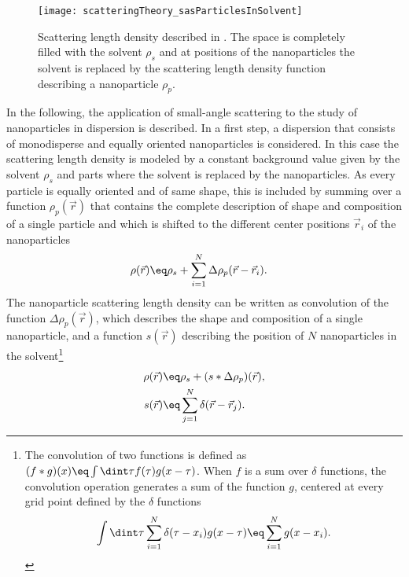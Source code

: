 \documentclass[\main/dresen_thesis.tex]{subfiles}
\begin{document}
    \begin{figure}[tb]
      \centering
      \texttt{[image: scatteringTheory\_sasParticlesInSolvent]}
      \caption{\label{fig:theoreticalBackground:scattering:scatteringTheory:sasParticlesInSolvent}Scattering length density described in . The space is completely filled with the solvent $\rho_s$ and at positions of the nanoparticles the solvent is replaced by the scattering length density function describing a nanoparticle $\rho_p$.}
    \end{figure}
    In the following, the application of small-angle scattering to the study of nanoparticles in dispersion is described.
    In a first step, a dispersion that consists of monodisperse and equally oriented nanoparticles is considered.
    In this case the scattering length density is modeled by a constant background value given by the solvent $\rho_s$ and parts where the solvent is replaced by the nanoparticles.
    As every particle is equally oriented and of same shape, this is included by summing over a function $\rho_p (\vec{r})$ that contains the complete description of shape and composition of a single particle and which is shifted to the different center positions $\vec{r}_i$ of the nanoparticles
    \begin{align}
      \rho(\vec{r}) \eq& \rho_s + \sum_{i=1}^N \Delta \rho_{p}(\vec{r} - \vec{r}_i).\label{eq:theoreticalBackground:scattering:scatteringTheory:sasParticlesInSolvent}
    \end{align}
    The nanoparticle scattering length density can be written as convolution of the function $\Delta \rho_{p}(\vec{r})$, which describes the shape and composition of a single nanoparticle, and a function $s(\vec{r})$ describing the position of $N$ nanoparticles in the solvent\footnote{The convolution of two functions is defined as $(f*g)(x) \eq \int \dint \tau f(\tau) g(x-\tau)$.
    When $f$ is a sum over $\delta$ functions, the convolution operation generates a sum of the function $g$, centered at every grid point defined by the $\delta$ functions
    \begin{equation}
      \int \dint \tau \sum_{i=1}^N \delta(\tau - x_i) g(x-\tau) \eq \sum_{i=1}^N g(x - x_i).
    \end{equation}}
    \begin{align}
      \rho(\vec{r}) \eq& \rho_s + (s * \Delta \rho_{p})(\vec{r}),\\
      s(\vec{r}) \eq& \sum_{j=1}^N \delta(\vec{r} - \vec{r}_j).
    \end{align}
\end{document}
